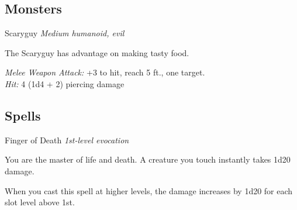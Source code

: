 \documentclass[10pt,twoside,twocolumn]{article}
\begin{document}
\newpage %

\subsection{Monsters}
\begin{monsterbox}{Scaryguy}{}
    \textit{Medium humanoid, evil} \\
    \basics[armorclass=12, hitpoints=16 (3d8+3), speed=50 ft]
    \stats[STR = 12 (+1), DEX = 14 (+2), CON = 13 (+1), 
           INT = 8 (-1),  WIS = 10 (+0), CHA = 7 (-2)]
    
    \details[ %
        skills = Perception +2,
        savingthrows = Dex +4,
        languages = {Common, Abyssal},
        challenge = 1/2 (100 xp)
    ]
    
    \begin{monsteraction}
        The Scaryguy has advantage on making tasty food.
    \end{monsteraction}

    \begin{monsteraction}[Shortsword]
        \textit{Melee Weapon Attack:} +3 to hit, reach 5 ft., one target.\\
        \textit{Hit:} 4 (1d4 + 2) piercing damage
    \end{monsteraction}
\end{monsterbox}

\subsection{Spells}
\begin{spellbox}{Finger of Death}
    \textit{1st-level evocation}\\
    \requirements[ %
        castingtime=1 action,
        range=Touch,
        components={V, S},
        duration=Instantaneous
    ]
    
    You are the master of life and death. A creature you touch instantly
    takes 1d20 damage.

    \begin{spellaction}
        When you cast this spell at higher levels, the damage increases by
        1d20 for each slot level above 1st.
    \end{spellaction}
\end{spellbox}

\end{document}
